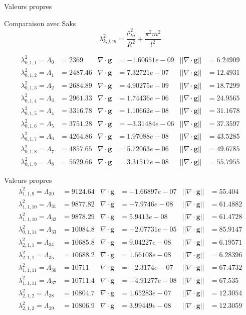 \documentclass{beamer}
\renewcommand{\div}{{\nabla\cdot}}
\begin{document}
\begin{frame}{Valeurs propres}
\begin{block}{Comparaison avec Saks}
\[
\lambda^2_{k,j,m} = \frac{\rho_{kj}^2}{R^2}+\frac{\pi^2m^2}{l^2}
\]
\end{block}
\begin{align*}
\lambda^2_{0,1,1} = \Lambda_{0} &= 2369	& \div\bm{g} &= -1.60651e-09	& ||\div\bm{g}|| &= 6.24909\\
\lambda^2_{0,1,2} = \Lambda_{1} &= 2487.46	& \div\bm{g} &= 7.32721e-07	& ||\div\bm{g}|| &= 12.4931\\
\lambda^2_{0,1,3} = \Lambda_{2} &= 2684.89	& \div\bm{g} &= 4.90275e-09	& ||\div\bm{g}|| &= 18.7299\\
\lambda^2_{0,1,4} = \Lambda_{3} &= 2961.33	& \div\bm{g} &= 1.74436e-06	& ||\div\bm{g}|| &= 24.9565\\
\lambda^2_{0,1,5} = \Lambda_{4} &= 3316.78	& \div\bm{g} &= 1.10662e-08	& ||\div\bm{g}|| &= 31.1678\\
\lambda^2_{0,1,6} = \Lambda_{5} &= 3751.28	& \div\bm{g} &= -3.31484e-06	& ||\div\bm{g}|| &= 37.3597\\
\lambda^2_{0,1,7} = \Lambda_{6} &= 4264.86	& \div\bm{g} &= 1.97088e-08	& ||\div\bm{g}|| &= 43.5285\\
\lambda^2_{0,1,8} = \Lambda_{7} &= 4857.65	& \div\bm{g} &= 5.72063e-06	& ||\div\bm{g}|| &= 49.6785\\
\lambda^2_{0,1,9} = \Lambda_{8} &= 5529.66	& \div\bm{g} &= 3.31517e-08	& ||\div\bm{g}|| &= 55.7955
\end{align*}
\end{frame}

\begin{frame}{Valeurs propres}
\begin{align*}
\lambda^2_{1,1,9} = \Lambda_{30} &= 9124.64	& \div\bm{g} &= -1.66897e-07	& ||\div\bm{g}|| &= 55.404\\
\lambda^2_{1,1,10} = \Lambda_{31} &= 9877.82	& \div\bm{g} &= -7.9746e-08	& ||\div\bm{g}|| &= 61.4882\\
\lambda^2_{1,1,10} = \Lambda_{32} &= 9878.29	& \div\bm{g} &= 5.9413e-08	& ||\div\bm{g}|| &= 61.4728\\
\lambda^2_{0,1,14} = \Lambda_{33} &= 10084.8	& \div\bm{g} &= -2.07731e-05	& ||\div\bm{g}|| &= 85.9147\\
\lambda^2_{2,1,1} = \Lambda_{34} &= 10685.8	& \div\bm{g} &= 9.04227e-08	& ||\div\bm{g}|| &= 6.19571\\
\lambda^2_{2,1,1} = \Lambda_{35} &= 10688.2	& \div\bm{g} &= 1.56108e-08	& ||\div\bm{g}|| &= 6.28396\\
\lambda^2_{1,1,11} = \Lambda_{36} &= 10711	& \div\bm{g} &= -2.3174e-07	& ||\div\bm{g}|| &= 67.4732\\
\lambda^2_{1,1,11} = \Lambda_{37} &= 10711.4	& \div\bm{g} &= -4.91277e-08	& ||\div\bm{g}|| &= 67.535\\
\lambda^2_{2,1,2} = \Lambda_{38} &= 10804.7	& \div\bm{g} &= 1.65283e-07	& ||\div\bm{g}|| &= 12.3054\\
\lambda^2_{2,1,2} = \Lambda_{39} &= 10806.9	& \div\bm{g} &= 3.99449e-08	& ||\div\bm{g}|| &= 12.3059
\end{align*}
\end{frame}
\end{document}
